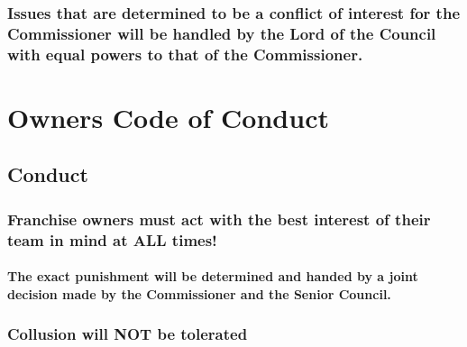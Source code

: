 \documentclass[
]{book}
\begin{document}
\hypertarget{issues-that-are-determined-to-be-a-conflict-of-interest-for-the-commissioner-will-be-handled-by-the-lord-of-the-council-with-equal-powers-to-that-of-the-commissioner.}{%
\subsection{Issues that are determined to be a conflict of interest for the Commissioner will be handled by the Lord of the Council with equal powers to that of the Commissioner.}\label{issues-that-are-determined-to-be-a-conflict-of-interest-for-the-commissioner-will-be-handled-by-the-lord-of-the-council-with-equal-powers-to-that-of-the-commissioner.}}

\hypertarget{code-of-conduct}{%
\chapter{Owners Code of Conduct}\label{code-of-conduct}}

\hypertarget{conduct}{%
\section{Conduct}\label{conduct}}

\hypertarget{franchise-owners-must-act-with-the-best-interest-of-their-team-in-mind-at-all-times}{%
\subsection{Franchise owners must act with the best interest of their team in mind at ALL times!}\label{franchise-owners-must-act-with-the-best-interest-of-their-team-in-mind-at-all-times}}

\hypertarget{the-exact-punishment-will-be-determined-and-handed-by-a-joint-decision-made-by-the-commissioner-and-the-senior-council.}{%
\subsubsection{The exact punishment will be determined and handed by a joint decision made by the Commissioner and the Senior Council.}\label{the-exact-punishment-will-be-determined-and-handed-by-a-joint-decision-made-by-the-commissioner-and-the-senior-council.}}

\hypertarget{collusion-will-not-be-tolerated}{%
\subsection{\texorpdfstring{Collusion will \textbf{NOT} be tolerated}{Collusion will NOT be tolerated}}\label{collusion-will-not-be-tolerated}}
\end{document}
